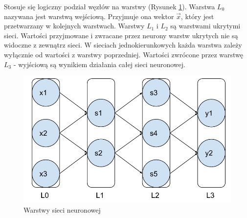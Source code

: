 \documentclass[a4paper,12pt,twoside,openany]{report}
\newcommand{\Rys}[1]{(Rysunek \ref{#1})}
\begin{document}
Stosuje się logiczny podział węzłów na warstwy \Rys{rys:mlp:warstwy}.
Warstwa $L_0$ nazywana jest warstwą wejściową.
Przyjmuje ona wektor $\vec x$, który jest przetwarzany w kolejnych warstwach.
Warstwy $L_1$ i $L_2$ są warstwami ukrytymi sieci. 
Wartości przyjmowane i zwracane przez neurony warstw ukrytych nie są widoczne z zewnątrz sieci.
W sieciach jednokierunkowych każda warstwa zależy wyłącznie od wartości z warstwy poprzedniej.
Wartości zwrócone przez warstwę $L_3$ - wyjściową są wynikiem działania całej sieci neuronowej.
\begin{figure}[h]
	\centering
	\includegraphics[width=\textwidth]{ann-warstwy}
	\caption{Warstwy sieci neuronowej}
	\label{rys:mlp:warstwy}
\end{figure}
\end{document}

